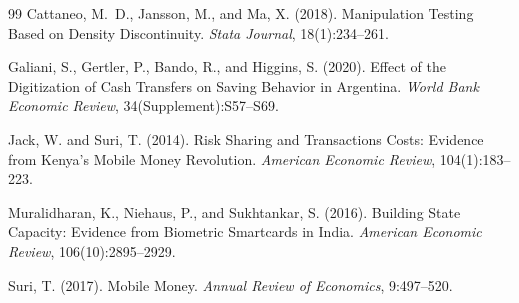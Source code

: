 \documentclass[12pt]{article}
\begin{document}
\begin{thebibliography}{99}
Cattaneo, M.~D., Jansson, M., and Ma, X. (2018).
Manipulation Testing Based on Density Discontinuity.
\textit{Stata Journal}, 18(1):234--261.

Galiani, S., Gertler, P., Bando, R., and Higgins, S. (2020).
Effect of the Digitization of Cash Transfers on Saving Behavior in Argentina.
\textit{World Bank Economic Review}, 34(Supplement):S57--S69.

Jack, W. and Suri, T. (2014).
Risk Sharing and Transactions Costs: Evidence from Kenya's Mobile Money Revolution.
\textit{American Economic Review}, 104(1):183--223.

Muralidharan, K., Niehaus, P., and Sukhtankar, S. (2016).
Building State Capacity: Evidence from Biometric Smartcards in India.
\textit{American Economic Review}, 106(10):2895--2929.

Suri, T. (2017).
Mobile Money.
\textit{Annual Review of Economics}, 9:497--520.

\end{thebibliography}
\end{document}
